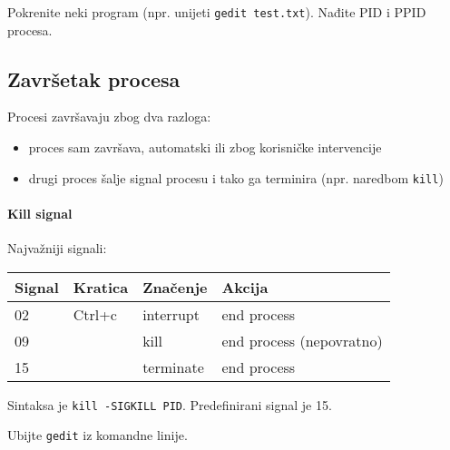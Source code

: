 \begin{zadatak} Pokrenite neki program (npr. unijeti \texttt{gedit test.txt}). Nađite PID i PPID procesa.
\end{zadatak}

\subsection*{Završetak procesa}
Procesi završavaju zbog dva razloga:
\begin{itemize}
 \item proces sam završava, automatski ili zbog korisničke intervencije
 \item drugi proces šalje signal procesu i tako ga terminira (npr. naredbom \texttt{kill})
\end{itemize}

\paragraph{Kill signal}
Najvažniji signali:
\begin{center}
\begin{tabularx}{0.7\textwidth}{lllX}
 \hline Signal & Kratica & Značenje & Akcija\\
 \hline 02 & Ctrl+c & interrupt & end process\\
 09 && kill & end process (nepovratno)\\
15&& terminate & end process\\
\hline
\end{tabularx}
\end{center}

Sintaksa je \texttt{kill -SIGKILL PID}.
Predefinirani signal je 15. 

\begin{zadatak} Ubijte \texttt{gedit} iz komandne linije.
\end{zadatak}

\begin{comment}

\vfill
\begin{itemize}
\renewcommand{\labelitemi}{\textbf{$\rightarrow$}}
\item Popis svih pokrenutih naredbi eksportirajte u datoteku imena \texttt{prezime\_ime\_vj10.txt}. Uploadajte datoteku na \href{https://moodle.oss.unist.hr/course/view.php?id=133}{http://moodle.oss.unist.hr}.
\end{itemize}

\end{comment}
